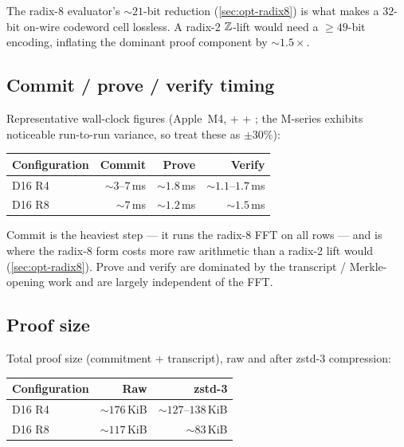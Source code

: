 \noindent The radix-8 evaluator's $\sim 21$-bit reduction
(\autoref{sec:opt-radix8}) is what makes a $32$-bit on-wire codeword
cell lossless. A radix-2 $\mathbb{Z}$-lift would need a $\ge 49$-bit encoding,
inflating the dominant proof component by $\sim 1.5\times$.

\subsection{Commit / prove / verify timing}

Representative wall-clock figures (Apple~M4,  +
 + ; the M-series exhibits noticeable
run-to-run variance, so treat these as $\pm 30\%$):

\begin{center}\small
\begin{tabular}{lrrr}
  \toprule
  Configuration & Commit & Prove & Verify \\
  \midrule
  D16 R4 & $\sim 3$--$7$\,ms & $\sim 1.8$\,ms & $\sim 1.1$--$1.7$\,ms \\
  D16 R8 & $\sim 7$\,ms       & $\sim 1.2$\,ms & $\sim 1.5$\,ms \\
  \bottomrule
\end{tabular}
\end{center}

\noindent Commit is the heaviest step --- it runs the radix-8 FFT on
all  rows --- and is where the radix-8 form costs more raw
arithmetic than a radix-2 lift would (\autoref{sec:opt-radix8}). Prove
and verify are dominated by the transcript / Merkle-opening work and
are largely independent of the FFT.

\subsection{Proof size}

Total proof size (commitment + transcript), raw and after zstd-3
compression:

\begin{center}\small
\begin{tabular}{lrr}
  \toprule
  Configuration & Raw & zstd-3 \\
  \midrule
  D16 R4 & $\sim 176$\,KiB & $\sim 127$--$138$\,KiB \\
  D16 R8 & $\sim 117$\,KiB & $\sim 83$\,KiB \\
  \bottomrule
\end{tabular}
\end{center}


